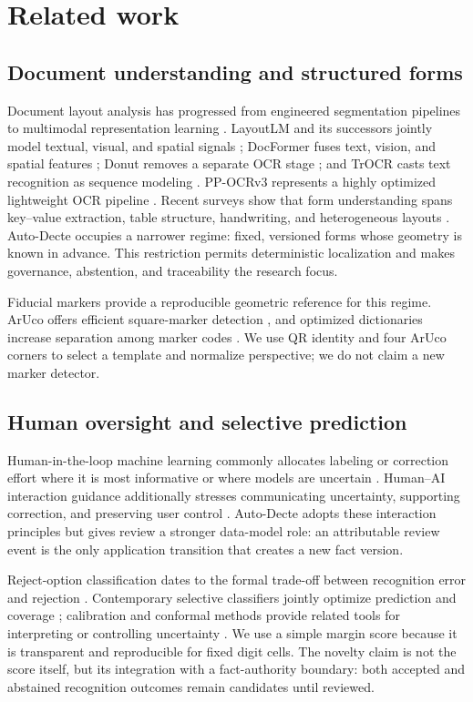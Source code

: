 \section{Related work}
\label{sec:related}

\subsection{Document understanding and structured forms}
Document layout analysis has progressed from engineered segmentation pipelines to multimodal representation learning \citep{binmakhashen2019}. LayoutLM and its successors jointly model textual, visual, and spatial signals \citep{layoutlm,layoutlmv2,layoutlmv3}; DocFormer fuses text, vision, and spatial features \citep{docformer}; Donut removes a separate OCR stage \citep{donut}; and TrOCR casts text recognition as sequence modeling \citep{trocr}. PP-OCRv3 represents a highly optimized lightweight OCR pipeline \citep{ppocrv3}. Recent surveys show that form understanding spans key--value extraction, table structure, handwriting, and heterogeneous layouts \citep{abdallah2024}. Auto-Decte occupies a narrower regime: fixed, versioned forms whose geometry is known in advance. This restriction permits deterministic localization and makes governance, abstention, and traceability the research focus.

Fiducial markers provide a reproducible geometric reference for this regime. ArUco offers efficient square-marker detection \citep{romero2018}, and optimized dictionaries increase separation among marker codes \citep{garrido2016}. We use QR identity and four ArUco corners to select a template and normalize perspective; we do not claim a new marker detector.

\subsection{Human oversight and selective prediction}
Human-in-the-loop machine learning commonly allocates labeling or correction effort where it is most informative or where models are uncertain \citep{budd2021,mosqueira2023}. Human--AI interaction guidance additionally stresses communicating uncertainty, supporting correction, and preserving user control \citep{amershi2019}. Auto-Decte adopts these interaction principles but gives review a stronger data-model role: an attributable review event is the only application transition that creates a new fact version.

Reject-option classification dates to the formal trade-off between recognition error and rejection \citep{chow1970}. Contemporary selective classifiers jointly optimize prediction and coverage \citep{geifman2017,geifman2019}; calibration and conformal methods provide related tools for interpreting or controlling uncertainty \citep{guo2017,angelopoulos2023}. We use a simple margin score because it is transparent and reproducible for fixed digit cells. The novelty claim is not the score itself, but its integration with a fact-authority boundary: both accepted and abstained recognition outcomes remain candidates until reviewed.

